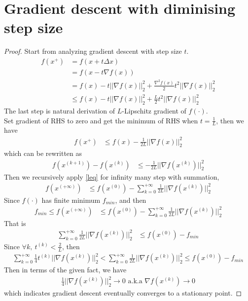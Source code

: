 \documentclass[11pt,a4paper]{article}
\begin{document}
\section{Gradient descent with diminising step size}
\begin{proof}
    Start from analyzing gradient descent with step size $t$.
    \begin{align}
        f(x^+) &= f(x + t \Delta x) \\
        &= f(x - t\nabla f(x)) \\
        &= f(x) - t|| \nabla f(x) ||_2^2 + \frac{\nabla^2 f(x)}{2} t^2 || \nabla f(x) ||_2^2 \\
        &\leq f(x) - t || \nabla f(x) ||_2^2 + \frac{L}{2} t^2 || \nabla f(x) ||_2^2 
    \end{align}
    The last step is natural derivation of $L$-Lipschitz gradient of
    $f(\cdot)$. \\
    Set gradient of RHS to zero and get the minimum of RHS when $t = \frac{1}{L}$, then we have
    \begin{align}
        f(x^+) &\leq f(x) - \frac{1}{2L} || \nabla f(x) ||_2^2  \label{leq}
    \end{align}
    which can be rewritten as
    \begin{align}
        f(x^{(k+1)}) - f(x^{(k)}) &\leq - \frac{1}{2L} || \nabla f(x^{(k)}) ||_2^2  \label{leq}
    \end{align}
    Then we recursively apply \eqref{leq} for infinity many step with summation,
    \begin{align}
        f(x^{(+\infty)}) &\leq f(x^{(0)}) - \sum_{k=0}^{+\infty} \frac{1}{2L} || \nabla f(x^{(k)}) ||_2^2 
    \end{align}
    Since $f(\cdot)$ has finite minimum $f_{min}$, and then
    \begin{align}
        f_{min} \leq f(x^{(+\infty)}) &\leq f(x^{(0)}) - \sum_{k=0}^{+\infty} \frac{1}{2L} || \nabla f(x^{(k)}) ||_2^2  
    \end{align}
    That is 
    \begin{align}
      \sum_{k=0}^{+\infty} \frac{1}{2L} || \nabla f(x^{(k)}) ||_2^2    &\leq f(x^{(0)}) - f_{min} 
    \end{align}
    Since $\forall k,\ t^{(k)} < \frac{2}{L}$, then
    \begin{align}
        \sum_{k=0}^{+\infty} \frac{1}{4} t^{(k)} || \nabla f(x^{(k)}) ||_2^2 <
      \sum_{k=0}^{+\infty} \frac{1}{2L} || \nabla f(x^{(k)}) ||_2^2 
      \leq f(x^{(0)}) - f_{min} 
    \end{align}
    Then in terms of the given fact, we have 
    \begin{align}
       \frac{1}{4} || \nabla f(x^{(k)}) ||_2^2 \rightarrow 0 \text{ a.k.a } 
        \nabla f(x^{(k)}) \rightarrow 0
    \end{align}
    which indicates gradient descent eventually converges to a stationary point.
\end{proof}
\end{document}
